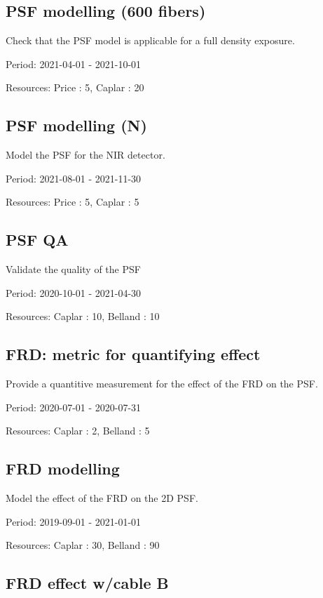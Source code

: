 \subsection{PSF modelling (600 fibers)}

Check that the PSF model is applicable for a full density exposure.

Period: 2021-04-01 - 2021-10-01

Resources: Price : 5, Caplar : 20

\subsection{PSF modelling (N)}

Model the PSF for the NIR detector.

Period: 2021-08-01 - 2021-11-30

Resources: Price : 5, Caplar : 5

\subsection{PSF QA}

Validate the quality of the PSF

Period: 2020-10-01 - 2021-04-30

Resources: Caplar : 10, Belland : 10

\subsection{FRD: metric for quantifying effect}

Provide a quantitive measurement for the effect of the FRD on the PSF.

Period: 2020-07-01 - 2020-07-31

Resources: Caplar : 2, Belland : 5

\subsection{FRD modelling}

Model the effect of the FRD on the 2D PSF.

Period: 2019-09-01 - 2021-01-01

Resources: Caplar : 30, Belland : 90

\subsection{FRD effect w/cable B}

